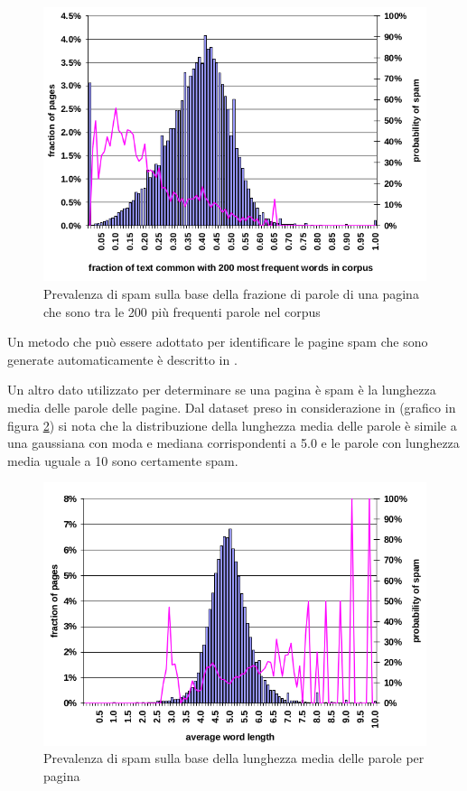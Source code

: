 \begin{figure}[htbp]
\centering
\includegraphics[width=12cm]{immagini/fetterly/fetterly9}
\caption{Prevalenza di spam sulla base della frazione di parole di una pagina che sono tra le 200 più frequenti parole nel corpus}
\label{fig:fetterly9}
\end{figure}
Un metodo che può essere adottato per identificare le pagine spam che sono generate automaticamente è descritto in \cite{Fetterly:2005:DPD:1076034.1076066}. 

Un altro dato utilizzato per determinare se una pagina è spam è la lunghezza media delle parole delle pagine. Dal dataset preso in considerazione in \cite{Ntoulas:2006:DSW:1135777.1135794} (grafico in figura \ref{fig:fetterly5}) si nota che la distribuzione della lunghezza media delle parole è simile a una gaussiana con moda e mediana corrispondenti a 5.0 e le parole con lunghezza media uguale a 10 sono certamente spam.
\begin{figure}[htbp]
\centering
\includegraphics[width=12cm]{immagini/fetterly/fetterly5}
\caption{Prevalenza di spam sulla base della lunghezza media delle parole per pagina}
\label{fig:fetterly5}
\end{figure}

